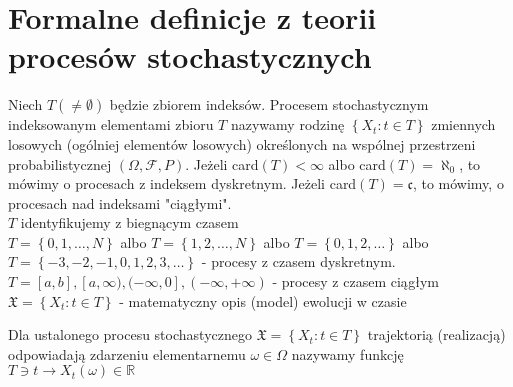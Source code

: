 \section{Formalne definicje z teorii procesów stochastycznych}
\begin{defi}
Niech $ T(\neq\emptyset) $ będzie zbiorem indeksów. Procesem stochastycznym indeksowanym elementami zbioru $ T $ nazywamy rodzinę $ \left\{X_t:t\in T\right\} $ zmiennych losowych (ogólniej elementów losowych) określonych na wspólnej przestrzeni probabilistycznej $(\Omega,\mathcal F,P)$. Jeżeli card$ (T)<\infty  $ albo card$ (T)=\aleph_0 $, to mówimy o procesach z indeksem dyskretnym. Jeżeli card$ (T)=\mathfrak c $, to mówimy, o procesach nad indeksami "ciągłymi".\\
$ T $ identyfikujemy z biegnącym czasem\\
$ T=\left\{0,1,\dots,N\right\} $
albo
$ T=\left\{1,2,\dots,N\right\} $
albo
$ T=\left\{0,1,2,\dots\right\} $
albo
$ T=\left\{-3,-2,-1,0,1,2,3,\dots\right\} $ - procesy z czasem dyskretnym.\\
$ T=[a,b],[a,\infty ),(-\infty ,0],(-\infty ,+\infty ) $ - procesy z czasem ciągłym\\
$ \mathfrak X=\left\{X_t:t\in T\right\} $ - matematyczny opis (model) ewolucji w czasie
\end{defi}
\begin{defi}
Dla ustalonego procesu stochastycznego $ \mathfrak X=\left\{X_t:t\in T\right\} $ trajektorią (realizacją) odpowiadają zdarzeniu elementarnemu $ \omega\in\Omega $ nazywamy funkcję\\
$ T\ni t\to X_t(\omega)\in \mathbb R $
\end{defi}
